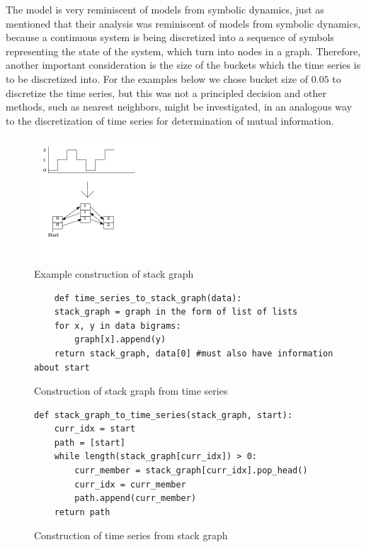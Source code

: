 \documentclass[12pt]{article}
\begin{document}
The model is very reminiscent of models from symbolic dynamics, just as \cite{campanharo} mentioned that their analysis was reminiscent of models from symbolic dynamics, because a continuous system is being discretized into a sequence of symbols representing the state of the system, which turn into nodes in a graph. Therefore, another important consideration is the size of the buckets which the time series is to be discretized into. For the examples below we chose bucket size of $0.05$ to discretize the time series, but this was not a principled decision and other methods, such as nearest neighbors, might be investigated, in an analogous way to the discretization of time series for determination of mutual information\cite{nnmi}.

\begin{figure}\label{fig:stackgraph}
  \begin{center}
    \includegraphics[scale=0.6]{stack_graph_ex}
  \end{center}
  \caption{Example construction of stack graph}
\end{figure}

\begin{figure}\label{fig:stackconstructionalgo}
  \begin{singlespace}
    \begin{verbatim}
    def time_series_to_stack_graph(data):
    stack_graph = graph in the form of list of lists
    for x, y in data bigrams:
        graph[x].append(y)
    return stack_graph, data[0] #must also have information about start
    \end{verbatim}
  \end{singlespace}
  \caption{Construction of stack graph from time series}
\end{figure}

\begin{figure}\label{fig:timeconstructionalgo}
\begin{singlespace}
\begin{verbatim}
def stack_graph_to_time_series(stack_graph, start):
    curr_idx = start
    path = [start]
    while length(stack_graph[curr_idx]) > 0:
        curr_member = stack_graph[curr_idx].pop_head()
        curr_idx = curr_member
        path.append(curr_member)
    return path
\end{verbatim}
\end{singlespace}
  \caption{Construction of time series from stack graph}
\end{figure}
\end{document}
